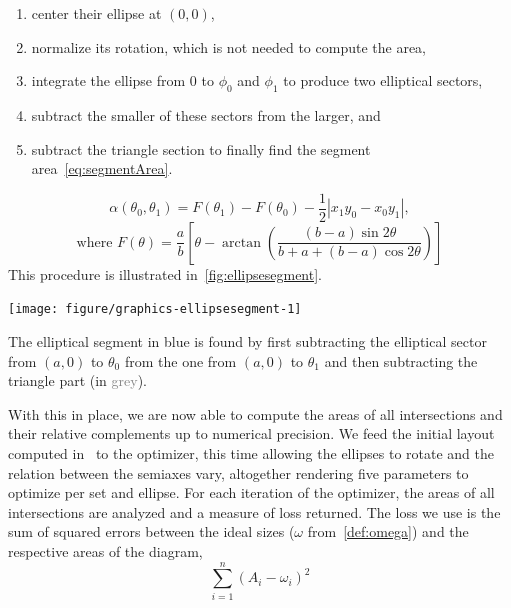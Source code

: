 \documentclass[
  oneside,
  usegeometry,
  numbers=noendperiod,
  openany,
  parskip=half
]{scrbook}\usepackage[]{graphicx}\usepackage{xcolor}
\newenvironment{knitrout}{}{} %
\begin{document}
\begin{enumerate}
\item center their ellipse at $(0, 0)$,
\item normalize its rotation, which is not needed to compute the area,
\item integrate the ellipse from $0$ to $\phi_0$ and $\phi_1$ to produce two elliptical sectors,
\item subtract the smaller of these sectors from the larger, and
\item subtract the triangle section to finally find the segment area~\eqref{eq:segmentArea}.
\end{enumerate}

\begin{equation*}
\alpha(\theta_0, \theta_1) = F(\theta_1) - F(\theta_0) -
\frac{1}{2}\left|x_1y_0 - x_0y_1\right|,
\label{eq:segmentArea}
\end{equation*}
\[
\text{where } F(\theta) = \frac{a}{b}\left[ \theta -
\arctan{\left(\frac{(b - a)\sin{2\theta}}{b + a +(b - a )\cos{2\theta}} \right)}
\right]
\]
This procedure is illustrated in~\cref{fig:ellipsesegment}.

\begin{marginfigure}
\begin{knitrout}
\color{fgcolor}

{\centering \texttt{[image: figure/graphics-ellipsesegment-1]} 

}



\end{knitrout}
\caption{The elliptical segment in \textcolor{SteelBlue4}{blue} is found by first subtracting the elliptical sector from $(a, 0)$ to $\theta_0$ from the one from $(a, 0)$ to $\theta_1$ and then subtracting the triangle part (in \textcolor{Grey}{grey}).}
\label{fig:ellipsesegment}
\end{marginfigure}

With this in place, we are now able to compute the areas of all intersections and their relative complements up to numerical precision. We feed the initial layout computed in~ to the optimizer, this time allowing the ellipses to rotate and the relation between the semiaxes vary, altogether rendering five parameters to optimize per set and ellipse. For each iteration of the optimizer, the areas of all intersections are analyzed and a measure of loss returned. The loss we use is the sum of squared errors between the ideal sizes ($\omega$ from~\cref{def:omega}) and the respective areas of the diagram,
\begin{equation}
\sum_{i=1}^{n}  (A_i-\omega_i)^2
\label{eq:loss}
\end{equation}
\end{document}
